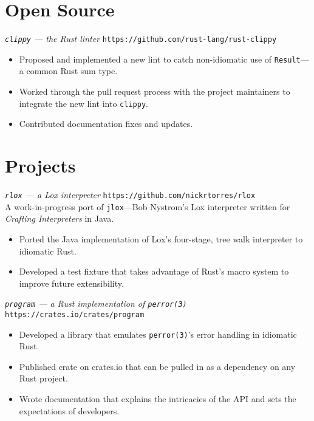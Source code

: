 \documentclass[margin]{res}
\begin{document}
\begin{resume}
\section{Open Source}
              {\sl \texttt{clippy} --- the Rust linter} \hfill \texttt{https://github.com/rust-lang/rust-clippy}
                 \begin{itemize}
                   \item Proposed and implemented a new lint to catch non-idiomatic use of
                   \texttt{Result}---a common Rust sum type.
                   \item Worked through the pull request process with the
                   project maintainers to integrate the new lint into
                   \texttt{clippy}.
                   \item Contributed documentation fixes and updates.
                 \end{itemize}
\section{Projects}
             {\sl \texttt{rlox} --- a Lox interpreter} \hfill \texttt{https://github.com/nickrtorres/rlox} \\
             A work-in-progress port of \texttt{jlox}---Bob Nystrom's Lox interpreter
             written for {\sl Crafting Interpreters} in Java.
                 \begin{itemize}
                   \item Ported the Java implementation of Lox's four-stage,
                   tree walk interpreter to idiomatic Rust.
                   \item Developed a test fixture that takes advantage of
                   Rust's macro system to improve future extensibility.
                 \end{itemize}

             {\sl \texttt{program} --- a Rust implementation of \texttt{perror(3)}} \hfill \texttt{https://crates.io/crates/program}
                 \begin{itemize}
                   \item Developed a library that emulates \texttt{perror(3)}'s
                   error handling in idiomatic Rust.
                   \item Published crate on crates.io that can be pulled in as
                   a dependency on any Rust project.
                   \item Wrote documentation that explains the intricacies of
                   the API and sets the expectations of developers.
                 \end{itemize}
\end{resume}
\end{document}
